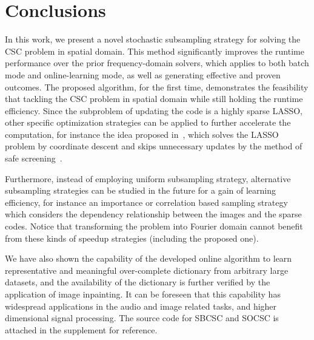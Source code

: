 \section{Conclusions}
In this work, we present a novel stochastic subsampling strategy for solving the CSC problem in spatial domain. This method significantly improves the runtime performance over the prior frequency-domain solvers, which applies to both batch mode and online-learning mode, as well as generating effective and proven outcomes. The proposed algorithm, for the first time, demonstrates the feasibility that tackling the CSC problem in spatial domain while still holding the runtime efficiency. Since the subproblem of updating the code is a highly sparse LASSO, other specific optimization strategies can be applied to further accelerate the computation, for instance the idea proposed in~\cite{johnson2017stingycd}, which solves the LASSO problem by coordinate descent and skips unnecessary updates by the method of safe screening~\cite{ghaoui2012Swfe}. 

Furthermore, instead of employing uniform subsampling strategy, alternative subsampling strategies can be studied in the future for a gain of learning efficiency, for instance an importance or correlation based sampling strategy which considers the dependency relationship between the images and the sparse codes. Notice that transforming the problem into Fourier domain cannot benefit from these kinds of speedup strategies (including the proposed one). 

We have also shown the capability of the developed online algorithm to learn representative and meaningful over-complete dictionary from arbitrary large datasets, and the availability of the dictionary is further verified by the application of image inpainting. It can be foreseen that this capability has widespread applications in the audio and image related tasks, and higher dimensional signal processing. The source code for SBCSC and SOCSC is attached in the supplement for reference. 